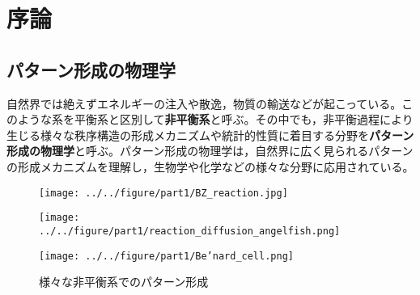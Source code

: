\documentclass[autodetect-engine,dvi=dvipdfmx,a4paper,ja=standard,oneside,openany,11pt,draft]{bxjsbook}
\begin{document}
\chapter{序論}
\section{パターン形成の物理学}
自然界では絶えずエネルギーの注入や散逸，物質の輸送などが起こっている。このような系を平衡系と区別して\textbf{非平衡系}と呼ぶ。その中でも，非平衡過程により生じる様々な秩序構造の形成メカニズムや統計的性質に着目する分野を\textbf{パターン形成の物理学}と呼ぶ。パターン形成の物理学は，自然界に広く見られるパターンの形成メカニズムを理解し，生物学や化学などの様々な分野に応用されている。
\begin{figure}[H]
  \centering
  \begin{minipage}
    {0.32\textwidth}
    \centering
    \texttt{[image: ../../figure/part1/BZ\_reaction.jpg]}
    \label{fig:BZ}
  \end{minipage}
  \begin{minipage}
    {0.32\textwidth}
    \centering
    \texttt{[image: ../../figure/part1/reaction\_diffusion\_angelfish.png]}
    \label{fig:reaction_diffusion_angelfish}
  \end{minipage}
  \begin{minipage}
    {0.32\textwidth}
    \centering
    \texttt{[image: ../../figure/part1/Be’nard\_cell.png]}
    \label{fig:Be’nard_cell}
  \end{minipage}
  \caption{様々な非平衡系でのパターン形成}
  \label{fig:pattern_formation}
\end{figure}
\end{document}
